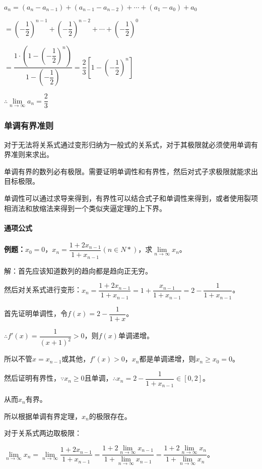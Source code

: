 \documentclass[UTF8, 12pt]{ctexart}
\begin{document}
$a_n=(a_n-a_{n-1})+(a_{n-1}-a_{n-2})+\cdots+(a_1-a_0)+a_0$\medskip

$=\left(-\dfrac{1}{2}\right)^{n-1} + \left(-\dfrac{1}{2}\right)^{n-2} + \cdots + \left(-\dfrac{1}{2}\right)^0$\medskip

$=\dfrac{1\cdot\left(1-\left(-\dfrac{1}{2}\right)^n\right)}{1-\left(-\dfrac{1}{2}\right)}=\dfrac{2}{3}\left[1-\left(-\dfrac{1}{2}\right)^n\right]$\medskip

$\therefore\lim\limits_{n\to\infty}a_n=\dfrac{2}{3}$

\subsubsection{单调有界准则}

对于无法将关系式通过变形归纳为一般式的关系式，对于其极限就必须使用单调有界准则来求出。

单调有界的数列必有极限。需要证明单调性和有界性，然后对式子求极限就能求出目标极限。

单调性可以通过求导来得到，有界性可以结合式子和单调性来得到，或者使用裂项相消法和放缩法来得到一个类似夹逼定理的上下界。

\paragraph{通项公式} \leavevmode \medskip

\textbf{例题：}$x_0=0$，$x_n=\dfrac{1+2x_{n-1}}{1+x_{n-1}}(n\in N*)$，求$\lim\limits_{n\to\infty}x_n$。\medskip

解：首先应该知道数列的趋向都是趋向正无穷。

然后对关系式进行变形：$x_n=\dfrac{1+2x_{n-1}}{1+x_{n-1}}=1+\dfrac{x_{n-1}}{1+x_{n-1}}=2-\dfrac{1}{1+x_{n-1}}$。

首先证明单调性，令$f(x)=2-\dfrac{1}{1+x}$。

$\therefore f'(x)=\dfrac{1}{(x+1)^2}>0$，则$f(x)$单调递增。

所以不管$x=x_{n-1}$或其他，$f'(x)>0$，$x_n$都是单调递增，则$x_n\geqslant x_0=0$。

然后证明有界性，$\because x_n\geqslant 0$且单调，$\therefore x_n=2-\dfrac{1}{1+x_{n-1}}\in[0,2]$。

从而$x_n$有界。

所以根据单调有界定理，$x_n$的极限存在。

对于关系式两边取极限：

$\lim\limits_{n\to\infty}x_n=\lim\limits_{n\to\infty}\dfrac{1+2x_{n-1}}{1+x_{n-1}}=\dfrac{1+2\lim\limits_{n\to\infty}x_{n-1}}{1+\lim\limits_{n\to\infty}x_{n-1}}=\dfrac{1+2\lim\limits_{n\to\infty}x_n}{1+\lim\limits_{n\to\infty}x_n}$。
\end{document}
